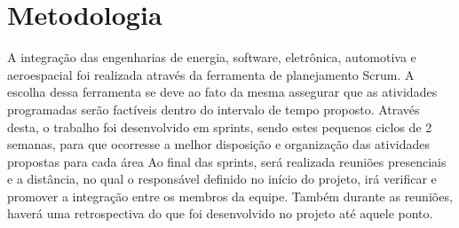 \section{Metodologia}
A integração das engenharias de energia, software, eletrônica, automotiva e aeroespacial foi realizada através da ferramenta de planejamento Scrum. A escolha dessa ferramenta se deve ao fato da mesma assegurar que as atividades programadas serão factíveis dentro do intervalo de tempo proposto. Através desta, o trabalho foi desenvolvido em sprints, sendo estes pequenos ciclos de 2 semanas, para que ocorresse a melhor disposição e organização das atividades propostas para cada área
Ao final das sprints, será realizada reuniões presenciais e a distância, no qual o responsável definido no início do projeto, irá verificar e promover a integração entre os membros da equipe. Também durante as reuniões, haverá uma retrospectiva do que foi desenvolvido no projeto até aquele ponto.   

